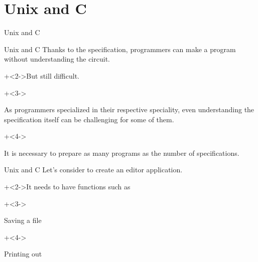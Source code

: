 %
%

\section{Unix and C}

\begin{frame}{}{}
    {\Huge Unix and C}
\end{frame}


\begin{frame}{Unix and C}{}
    Thanks to the specification, programmers can make a program without understanding the circuit.
    \vspace{4ex}

    \onslide+<2->{But still difficult.}
    \vspace{4ex}

    \begin{itemize}
        \onslide+<3->{\item As programmers specialized in their respective speciality, even understanding the specification itself can be challenging for some of them.}
        \onslide+<4->{\item It is necessary to prepare as many programs as the number of specifications.}
    \end{itemize}
\end{frame}


\begin{frame}{Unix and C}{}
    Let's consider to create an editor application.
    \vspace{4ex}

    \onslide+<2->{It needs to have functions such as}
    \vspace{2ex}

    \begin{itemize}
        \onslide+<3->{\item Saving a file}
        \onslide+<4->{\item Printing out}
    \end{itemize}
\end{frame}


